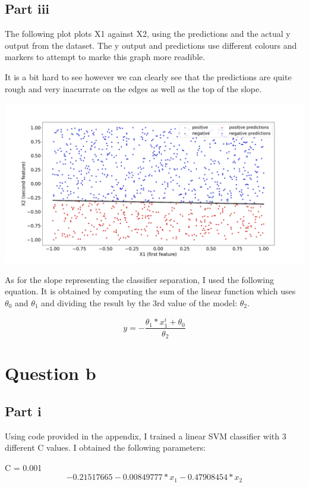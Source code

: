 \documentclass[10pt]{article}
\begin{document}
\subsection*{Part iii}
The following plot plots X1 against X2, using the predictions and
the actual y output from the dataset.
The y output and predictions use different colours and markers to attempt to marke
this graph more readible.



It is a bit hard to see however we can clearly see that the predictions
are quite rough and very inacurrate on the edges as well as the top of the
slope.

\includegraphics[scale=0.245]{Figure_2.png}

As for the slope representing the classifier separation, I used the
following equation. It is obtained by computing the sum of the linear function
which uses $\theta_{0}$ and $\theta_{1}$ and dividing the result
by the 3rd value of the model: $\theta_{2}$.

\begin{equation*}
    y = -\frac{\theta_{1} * x_{1}^{i} + \theta_{0}}{\theta_{2}}
\end{equation*}

\section*{Question b}
\subsection*{Part i}
Using code provided in the appendix, I trained a linear SVM
classifier with 3 different C values. I obtained the following parameters:

C = 0.001
\begin{equation*}
    -0.21517665 - 0.00849777 * x_{1} - 0.47908454 * x_{2}
\end{equation*}
\end{document}
